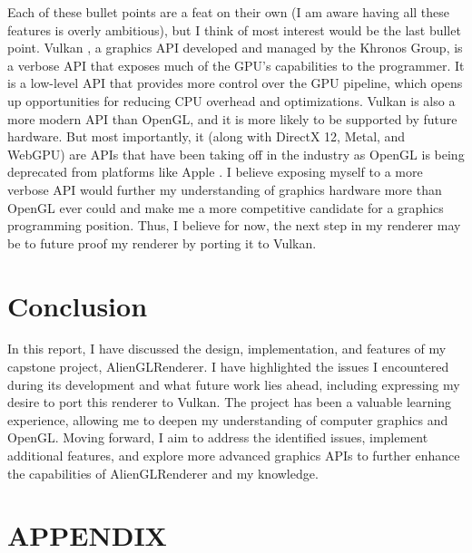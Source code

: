 \documentclass[letterpaper, 10 pt, conference]{ieeeconf}  %
\begin{document}
Each of these bullet points are a feat on their own (I am aware having all these features is overly ambitious), but I think of most interest would be the last bullet point. Vulkan \cite{Vulkan2024}, a graphics API developed and managed by the Khronos Group, is a verbose API that exposes much of the GPU's capabilities to the programmer. It is a low-level API that provides more control over the GPU pipeline, which opens up opportunities for reducing CPU overhead and optimizations. Vulkan is also a more modern API than OpenGL, and it is more likely to be supported by future hardware. But most importantly, it (along with DirectX 12, Metal, and WebGPU) are APIs that have been taking off in the industry as OpenGL is being deprecated from platforms like Apple \cite{Horwitz_2018}. I believe exposing myself to a more verbose API would further my understanding of graphics hardware more than OpenGL ever could and make me a more competitive candidate for a graphics programming position. Thus, I believe for now, the next step in my renderer may be to future proof my renderer by porting it to Vulkan.

\section {Conclusion}
In this report, I have discussed the design, implementation, and features of my capstone project, AlienGLRenderer. I have highlighted the issues I encountered during its development and what future work lies ahead, including expressing my desire to port this renderer to Vulkan. The project has been a valuable learning experience, allowing me to deepen my understanding of computer graphics and OpenGL. Moving forward, I aim to address the identified issues, implement additional features, and explore more advanced graphics APIs to further enhance the capabilities of AlienGLRenderer and my knowledge.

\section*{APPENDIX}
\end{document}
